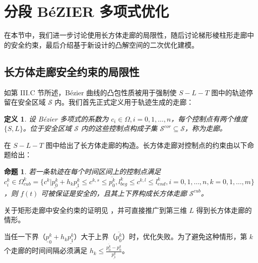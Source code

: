 \documentclass[UTF8,a4paper,12pt,fontset=none]{ctexart}
\theoremstyle{definition}
\newtheorem{definition}{定义}
\theoremstyle{plain}
\newtheorem{proposition}{命题}
\theoremstyle{plain}
\theoremstyle{plain}
\begin{document}
\section{分段 B\'{e}ZIER 多项式优化}
在本节中，我们进一步讨论使用长方体走廊的局限性，随后讨论梯形棱柱形走廊中的安全约束，最后介绍基于新设计的凸解空间的二次优化建模。

\subsection{长方体走廊安全约束的局限性}
如第 III.C 节所述，B\'{e}zier 曲线的凸包性质被用于强制使 $S-L-T$ 图中的轨迹停留在安全区域 $\mathcal{S}$ 内。我们首先正式定义用于轨迹生成的走廊：

\begin{definition}
\textit{设 B\'{e}zier 多项式的系数为 $c_i \in \Omega, i=0,1,\ldots,n$，每个控制点有两个维度 $\{S, L\}$。位于安全区域 $\mathcal{S}$ 内的这些控制点构成子集 $\mathcal{S}^{cor} \subseteq \mathcal{S}$，称为走廊。}
\end{definition}

\citet{ding_safe_2019} 在 $S-L-T$ 图中给出了长方体走廊的构造。长方体走廊对控制点的约束由以下命题给出：

\begin{proposition}
若一条轨迹在每个时间区间上的控制点满足 $c^{k}_i \in \Omega^{k}_{cub} = \{c^k | \underline{p_{0}^{k}}+h_{k} \underline{p_{1}^{k}} \leq c^{k,s} \leq \overline{p_{0}^{k}}, l^{k}_{beg} \leq c^{k,l} \leq l^{k}_{end}, i=0,1,\ldots,n, k=0,1,\ldots,m\}$，则 $f(t)$ 可被保证是安全的，且其上下界构成长方体走廊 $\mathcal{S}^{cub}$。
\end{proposition}
关于矩形走廊中安全约束的证明见 \cite{li_motion_nodate}，并可直接推广到第三维 $L$ 得到长方体走廊的情形。


当任一下界（$\underline{p}_{0}^{k}+h_{k} \underline{p_{1}^{k}}$）大于上界（$\overline{p_{0}^{k}}$）时，优化失败。为了避免这种情形，第 $k$ 个走廊的时间间隔必须满足 $h_{k} \leq \frac{\overline{p_{0}^{k}}-p_{0}^{k}}{\underline{p_{1}^{k}}}$。
\end{document}
